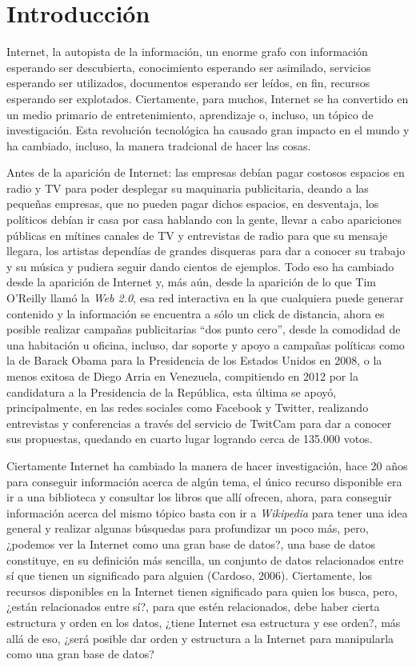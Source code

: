 \chapter*{Introducci\'on}
\label{chap:introduccion}

Internet, la autopista de la información, un enorme grafo con información esperando ser descubierta, conocimiento esperando ser asimilado, servicios esperando ser utilizados, documentos esperando ser leídos, en fin, recursos esperando ser explotados. Ciertamente, para muchos, Internet se ha convertido en un medio primario de entretenimiento, aprendizaje o, incluso, un tópico de investigación. Esta revolución tecnológica ha causado gran impacto en el mundo y ha cambiado, incluso, la manera tradcional de hacer las cosas.

Antes de la aparición de Internet: las empresas debían pagar costosos espacios en radio y TV para poder desplegar su maquinaria publicitaria, deando a las pequeñas empresas, que no pueden pagar dichos espacios, en desventaja, los políticos debían ir casa por casa hablando con la gente, llevar a cabo apariciones públicas en mítines canales de TV y entrevistas de radio para que su mensaje llegara, los artistas dependías de grandes disqueras para dar a conocer su trabajo y su música y pudiera seguir dando cientos de ejemplos. Todo eso ha cambiado desde la aparición de Internet y, más aún, desde la aparición de lo que Tim O'Reilly llamó la \textit{Web 2.0}, esa red interactiva en la que cualquiera puede generar contenido y la información se encuentra a sólo un click de distancia, ahora es posible realizar campañas publicitarias ``dos punto cero'', desde la comodidad de una habitación u oficina, incluso, dar soporte y apoyo a campañas políticas como la de Barack Obama para la Presidencia de los Estados Unidos en 2008, o la menos exitosa de Diego Arria en Venezuela, compitiendo en 2012 por la candidatura a la Presidencia de la República, esta última se apoyó, principalmente, en las redes sociales como Facebook y Twitter, realizando entrevistas y conferencias a través del servicio de TwitCam para dar a conocer sus propuestas, quedando en cuarto lugar logrando cerca de 135.000 votos.

Ciertamente Internet ha cambiado la manera de hacer investigación, hace 20 años para conseguir información acerca de algún tema, el único recurso disponible era ir a una biblioteca y consultar los libros que allí ofrecen, ahora, para conseguir información acerca del mismo tópico basta con ir a \textit{Wikipedia} para tener una idea general y realizar algunas búsquedas para profundizar un poco más, pero, ¿podemos ver la Internet como una gran base de datos?, una base de datos constituye, en su definición más sencilla, un conjunto de datos relacionados entre sí que tienen un significado para alguien (Cardoso, 2006). Ciertamente, los recursos disponibles en la Internet tienen significado para quien los busca, pero, ¿están relacionados entre sí?, para que estén relacionados, debe haber cierta estructura y orden en los datos, ¿tiene Internet esa estructura y ese orden?, más allá de eso, ¿será posible dar orden y estructura a la Internet para manipularla como una gran base de datos?

